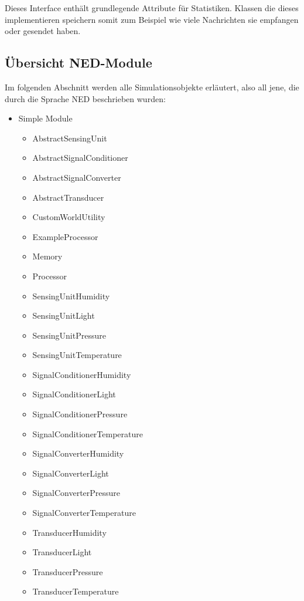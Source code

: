 Dieses Interface enthält grundlegende Attribute für Statistiken. Klassen die dieses implementieren speichern somit zum Beispiel wie viele Nachrichten sie empfangen oder gesendet haben.

\subsection{Übersicht NED-Module}

Im folgenden Abschnitt werden alle Simulationsobjekte erläutert, also all jene, die durch die Sprache NED beschrieben wurden:


\begin{minipage}{\textwidth}
\begin{itemize}{\label{enum:NedModules}}
\item Simple Module
\begin{multicols}{2}
\begin{itemize}
\item AbstractSensingUnit
\item AbstractSignalConditioner
\item AbstractSignalConverter
\item AbstractTransducer
\item CustomWorldUtility
\item ExampleProcessor
\item Memory
\item Processor
\item SensingUnitHumidity
\item SensingUnitLight
\item SensingUnitPressure
\item SensingUnitTemperature
\item SignalConditionerHumidity
\item SignalConditionerLight
\item SignalConditionerPressure
\item SignalConditionerTemperature
\item SignalConverterHumidity
\item SignalConverterLight
\item SignalConverterPressure
\item SignalConverterTemperature
\item TransducerHumidity
\item TransducerLight
\item TransducerPressure
\item TransducerTemperature 

\end{itemize}
\end{multicols}
\end{itemize}
\end{minipage}
